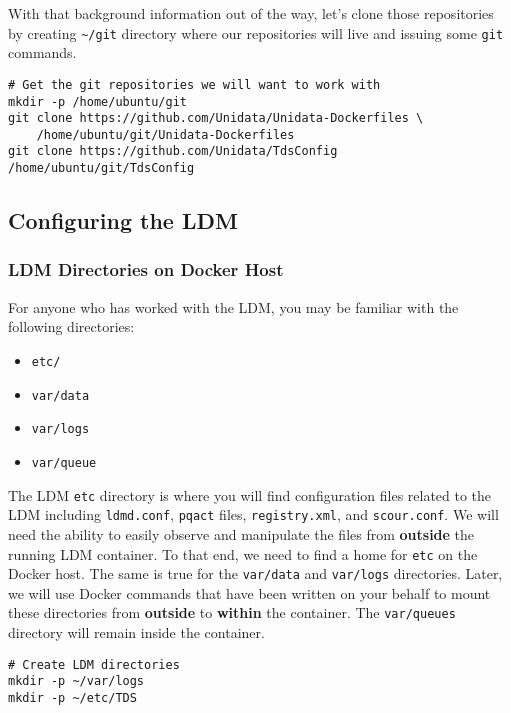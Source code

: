 \documentclass[11pt]{article}
\begin{document}
With that background information out of the way, let's clone those repositories by creating \texttt{\textasciitilde{}/git} directory where our repositories will live and issuing some \texttt{git} commands.

\begin{verbatim}
# Get the git repositories we will want to work with
mkdir -p /home/ubuntu/git
git clone https://github.com/Unidata/Unidata-Dockerfiles \
    /home/ubuntu/git/Unidata-Dockerfiles
git clone https://github.com/Unidata/TdsConfig /home/ubuntu/git/TdsConfig
\end{verbatim}

\subsection{Configuring the LDM}
\label{sec:orgheadline24}
\subsubsection{LDM Directories on Docker Host}
\label{sec:orgheadline16}

For anyone who has worked with the LDM, you may be familiar with the following directories:


\begin{itemize}
\item \texttt{etc/}
\item \texttt{var/data}
\item \texttt{var/logs}
\item \texttt{var/queue}
\end{itemize}


The LDM \texttt{etc} directory is where you will find configuration files related to the LDM including \texttt{ldmd.conf}, \texttt{pqact} files, \texttt{registry.xml}, and  \texttt{scour.conf}. We will need the ability to easily observe and manipulate the files from \textbf{outside} the running LDM container. To that end, we need to find a home for \texttt{etc} on the Docker host. The same is true for the \texttt{var/data} and \texttt{var/logs} directories. Later, we will use Docker commands that have been written on your behalf to mount these directories from \textbf{outside} to \textbf{within} the container. The \texttt{var/queues} directory will remain inside the container.

\begin{verbatim}
# Create LDM directories
mkdir -p ~/var/logs 
mkdir -p ~/etc/TDS
\end{verbatim}
\end{document}
